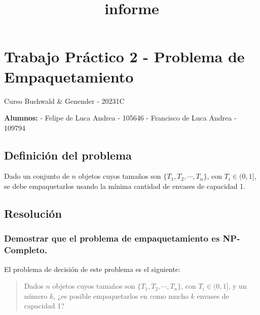 \documentclass[11pt]{article}
\title{informe}
\begin{document}
    
    \hypertarget{trabajo-pruxe1ctico-2---problema-de-empaquetamiento}{%
\section{Trabajo Práctico 2 - Problema de
Empaquetamiento}\label{trabajo-pruxe1ctico-2---problema-de-empaquetamiento}}

    Curso Buchwald \& Genender - 20231C

\textbf{Alumnos:} - Felipe de Luca Andrea - 105646 - Francisco de Luca
Andrea - 109794

\hspace{1cm}
\tableofcontents
\newpage

    \hypertarget{definiciuxf3n-del-problema}{%
\subsection{Definición del problema}\label{definiciuxf3n-del-problema}}

Dado un conjunto de \(n\) objetos cuyos tamaños son
\(\{T_1, T_2, \dotsb , T_n\}\), con \(T_i \in (0, 1]\), se debe
empaquetarlos usando la mínima cantidad de envases de capacidad 1.

    \hypertarget{resoluciuxf3n}{%
\subsection{Resolución}\label{resoluciuxf3n}}

    \hypertarget{demostrar-que-el-problema-de-empaquetamiento-es-np-completo.}{%
\subsubsection{Demostrar que el problema de empaquetamiento es
NP-Completo.}\label{demostrar-que-el-problema-de-empaquetamiento-es-np-completo.}}

    El problema de decisión de este problema es el siguiente:

\begin{quote}
Dados \(n\) objetos cuyos tamaños son \(\{T_1, T_2, \dotsb , T_n\}\),
con \(T_i \in (0, 1]\), y un número \(k\), ¿es posible empaquetarlos en
como mucho \(k\) envases de capacidad 1?
\end{quote}
\end{document}
